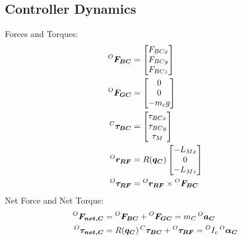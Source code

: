 \subsection{Controller Dynamics}
Forces and Torques:
\begin{align*}
  \prescript{O}{}{\bm{F_{BC}}} &=
  \begin{bmatrix}
    F_{BCx} \\ F_{BCy} \\ F_{BCz}
  \end{bmatrix} \\
  \prescript{O}{}{\bm{F_{GC}}} &=
  \begin{bmatrix}
    0 \\ 0 \\ -m_c g
  \end{bmatrix} \\
  \prescript{C}{}{\bm{\tau_{BC}}} &=
  \begin{bmatrix}
    \tau_{BCx} \\ \tau_{BCy} \\ \tau_{M} 
  \end{bmatrix} \\
  \prescript{O}{}{\bm{r_{RF}}} &= R(\bm{q_C}) \begin{bmatrix}
                                   -L_{Mx} \\ 0 \\ -L_{Mz}
                                 \end{bmatrix} \\
  \prescript{O}{}{\bm{\tau_{RF}}} &=  \prescript{O}{}{\bm{r_{RF}}} \times \prescript{O}{}{\bm{F_{BC}}}
\end{align*}
Net Force and Net Torque:
\begin{align}
  \prescript{O}{}{\bm{F_{net, C}}} &= \prescript{O}{}{\bm{F_{BC}}} + \prescript{O}{}{\bm{F_{GC}}} = m_C \prescript{O}{}{\bm{a_C}} \\
  \prescript{O}{}{\bm{\tau_{net, C}}} &= R(\bm{q_C})\prescript{C}{}{\bm{\tau_{BC}}} + \prescript{O}{}{\bm{\tau_{RF}}} = \prescript{O}{}{I_c} \prescript{O}{}{\bm{\alpha_C}}
\end{align}
